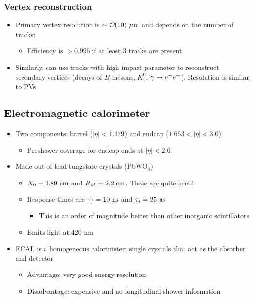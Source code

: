 \subsubsection{Vertex reconstruction}
\begin{itemize}
  \item Primary vertex resolution is $\sim \mathcal{O}(10)~\mu\text{m}$ and depends on the number of tracks:
  \begin{itemize}
    \item Efficiency is $>0.995$ if at least 3 tracks are present
  \end{itemize}
  \item Similarly, can use tracks with high impact parameter to reconstruct secondary vertices (decays of $B$ mesons, $K^0$, $\gamma\rightarrow e^{-}e^{+}$). Resolution is similar to PVs
\end{itemize}

\subsection{Electromagnetic calorimeter}
\begin{itemize}
  \item Two components: barrel ($|\eta|<1.479$) and endcap ($1.653<|\eta|<3.0$)
  \begin{itemize}
    \item Preshower coverage for endcap ends at $|\eta|<2.6$
  \end{itemize}
  \item Made out of lead-tungstate crystals (PbWO$_4$)
  \begin{itemize}
    \item $X_0 = 0.89~\text{cm}$ and $R_M = 2.2~\text{cm}$. These are quite small
    \item Response times are $\tau_f = 10~\text{ns}$ and $\tau_s = 25~\text{ns}$
    \begin{itemize}
      \item This is an order of magnitude better than other inorganic scintillators
    \end{itemize}
    \item Emits light at 420 nm
  \end{itemize}
  \item ECAL is a homogeneous calorimeter: single crystals that act as the absorber and detector
  \begin{itemize}
    \item Advantage: very good energy resolution
    \item Disadvantage: expensive and no longitudinal shower information
  \end{itemize}
\end{itemize}

